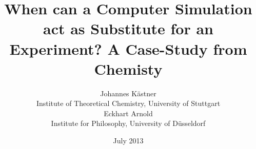 \documentclass[12pt, a4paper]{article}
\numberwithin{equation}{section}
\begin{document}

%
\title{When can a Computer Simulation act as Substitute for an
Experiment? A Case-Study from Chemisty}

%
%
\author{
  Johannes Kästner\\{\small Institute of Theoretical Chemistry, University of Stuttgart}\\
  Eckhart Arnold\\{\small Institute for Philosophy, University of Düsseldorf}
}


%
%
%
%
\date{July 2013}
%

\maketitle
\end{document}
